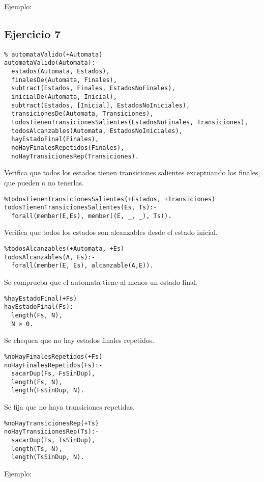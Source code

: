\documentclass[10pt, a4paper,english,spanish,hidelinks]{article}
\begin{document}
Ejemplo:


\subsection{Ejercicio 7}
\begin{verbatim}
% automataValido(+Automata)
automataValido(Automata):-
  estados(Automata, Estados),
  finalesDe(Automata, Finales),
  subtract(Estados, Finales, EstadosNoFinales),
  inicialDe(Automata, Inicial),
  subtract(Estados, [Inicial], EstadosNoIniciales),
  transicionesDe(Automata, Transiciones),
  todosTienenTransicionesSalientes(EstadosNoFinales, Transiciones),
  todosAlcanzables(Automata, EstadosNoIniciales),
  hayEstadoFinal(Finales),
  noHayFinalesRepetidos(Finales),
  noHayTransicionesRep(Transiciones).
\end{verbatim}
						
Verifica que todos los estados tienen transiciones salientes exceptuando los finales, que pueden
o no tenerlas.
\begin{verbatim}
%todosTienenTransicionesSalientes(+Estados, +Transiciones)
todosTienenTransicionesSalientes(Es, Ts):- 
  forall(member(E,Es), member((E, _, _), Ts)).
\end{verbatim}

Verifica que todos los estados son alcanzables desde el estado inicial.
\begin{verbatim}
%todosAlcanzables(+Automata, +Es)
todosAlcanzables(A, Es):- 
  forall(member(E, Es), alcanzable(A,E)). 
\end{verbatim}

Se comprueba que el automata tiene al menos un estado final.
\begin{verbatim}
%hayEstadoFinal(+Fs)
hayEstadoFinal(Fs):- 
  length(Fs, N), 
  N > 0.
\end{verbatim}

Se chequea que no hay estados finales repetidos.
\begin{verbatim}
%noHayFinalesRepetidos(+Fs)
noHayFinalesRepetidos(Fs):- 
  sacarDup(Fs, FsSinDup), 
  length(Fs, N), 
  length(FsSinDup, N).
\end{verbatim}

Se fija que no haya transiciones repetidas.
\begin{verbatim}
%noHayTransicionesRep(+Ts)
noHayTransicionesRep(Ts):- 
  sacarDup(Ts, TsSinDup), 
  length(Ts, N), 
  length(TsSinDup, N).
\end{verbatim}

Ejemplo:
\end{document}
